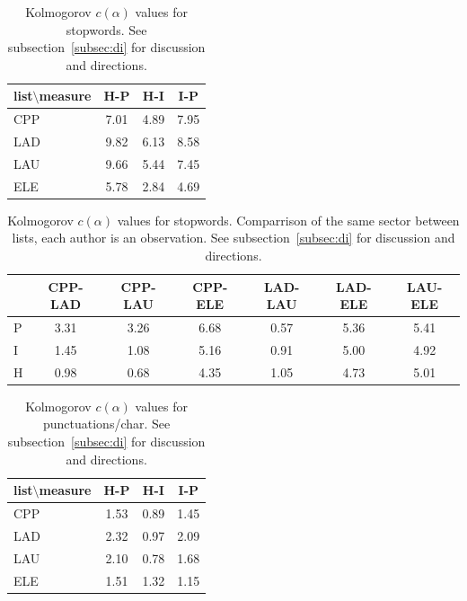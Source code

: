 \documentclass[%
 aip,
 jmp,%
 amsmath,amssymb,
 reprint,%
 floatfix,
]{revtex4-1}
\begin{document}
\begin{table}
  \centering
    \small
\setlength{\tabcolsep}{.26667em}
  \begin{tabular}{|l|| c|c|c|}\hline
list$\setminus$measure & H-P & H-I & I-P \\\hline
CPP & 7.01 & 4.89 & 7.95 \\\hline
LAD & 9.82 & 6.13 & 8.58 \\\hline
LAU & 9.66 & 5.44 & 7.45 \\\hline
ELE & 5.78 & 2.84 & 4.69 \\\hline
  \end{tabular}
  \caption{Kolmogorov $c(\alpha)$ values for stopwords. See subsection~\ref{subsec:di} for discussion and directions.}
  \label{tab:kolSw}
\end{table}


\begin{table}
  \centering
    \small
\setlength{\tabcolsep}{.06667em}
  \begin{tabular}{|l|| c|c|c|c|c|c|}\hline
 & CPP-LAD & CPP-LAU & CPP-ELE & LAD-LAU & LAD-ELE & LAU-ELE \\\hline
P & 3.31 & 3.26 & 6.68 & 0.57 & 5.36 & 5.41 \\\hline
I & 1.45 & 1.08 & 5.16 & 0.91 & 5.00 & 4.92 \\\hline
H & 0.98 & 0.68 & 4.35 & 1.05 & 4.73 & 5.01 \\\hline
  \end{tabular}
  \caption{Kolmogorov $c(\alpha)$ values for stopwords. Comparrison of the same sector between lists, each author is an observation. See subsection~\ref{subsec:di} for discussion and directions.}
  \label{tab:kolSwInter}
\end{table}



\begin{table}
  \centering
    \small
\setlength{\tabcolsep}{.26667em}
  \begin{tabular}{|l|| c|c|c|}\hline
list$\setminus$measure & H-P & H-I & I-P \\\hline
CPP & 1.53 & 0.89 & 1.45 \\\hline
LAD & 2.32 & 0.97 & 2.09 \\\hline
LAU & 2.10 & 0.78 & 1.68 \\\hline
ELE & 1.51 & 1.32 & 1.15 \\\hline
  \end{tabular}
  \caption{Kolmogorov $c(\alpha)$ values for punctuations/char. See subsection~\ref{subsec:di} for discussion and directions.}
  \label{tab:kolPct}
\end{table}
\end{document}
